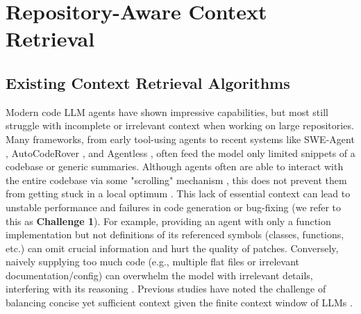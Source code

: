 \chapter{Repository-Aware Context Retrieval}
\label{cha:ch1}

\section{Existing Context Retrieval Algorithms}

Modern code LLM agents have shown impressive capabilities, but most still struggle with incomplete or irrelevant context when working on large repositories. Many frameworks, from early tool-using agents to recent systems like SWE-Agent \cite{yang2024sweagent}, AutoCodeRover \cite{zhang2024autocoderover}, and Agentless \cite{xia2024agentlessdemystifyingllmbasedsoftware}, often feed the model only limited snippets of a codebase or generic summaries. Although agents often are able to interact with the entire codebase via some "scrolling" mechanism  , this does not prevent them from getting stuck in a local optimum \cite{ouyang2025repographenhancingaisoftware} . This lack of essential context can lead to unstable performance and failures in code generation or bug-fixing (we refer to this as \textbf{Challenge 1}). For example, providing an agent with only a function implementation but not definitions of its referenced symbols (classes, functions, etc.) can omit crucial information and hurt the quality of patches. Conversely, naively supplying too much code (e.g., multiple flat files or irrelevant documentation/config) can overwhelm the model with irrelevant details, interfering with its reasoning . Previous studies have noted the challenge of balancing concise yet sufficient context given the finite context window of LLMs \cite{ouyang2025repographenhancingaisoftware}.


